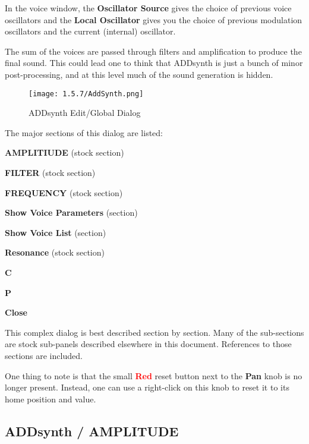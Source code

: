   In the voice window, the \textbf{Oscillator Source} gives the choice of
   previous voice oscillators and the \textbf{Local Oscillator} gives you the
   choice of previous modulation oscillators and the current (internal) oscillator.

   The sum of the voices are passed through filters and amplification to
   produce the final sound. This could lead one to think that ADDsynth is just
   a bunch of minor post-processing, and at this level much of the sound
   generation is hidden.

\begin{figure}[H]
   \centering
   \texttt{[image: 1.5.7/AddSynth.png]}
   \caption{ADDsynth Edit/Global Dialog}
   \label{fig:addsynth_edit_dialog}
\end{figure}

   The major sections of this dialog are listed:

   \begin{enumber}
      \item \textbf{AMPLITIUDE} (stock section)
      \item \textbf{FILTER} (stock section)
      \item \textbf{FREQUENCY} (stock section)
      \item \textbf{Show Voice Parameters} (section)
      \item \textbf{Show Voice List} (section)
      \item \textbf{Resonance} (stock section)
      \item \textbf{C}
      \item \textbf{P}
      \item \textbf{Close}
   \end{enumber}

   This complex dialog is best described section by section.
   Many of the sub-sections are stock sub-panels described elsewhere
   in this document.  References to those sections are included.

   One thing to note is that the small \textbf{\textcolor{red}{Red}}
   reset button next to the \textbf{Pan} knob is no longer present.  Instead,
   one can use a right-click on this knob to reset it to its home position and
   value.

\subsection{ADDsynth / AMPLITUDE}
\label{subsec:addsynth_amplitude}

